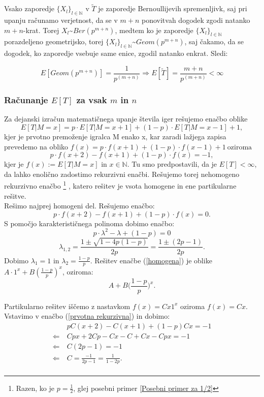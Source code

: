 \documentclass[12pt, a4paper]{article}
\begin{document}
Vsako zaporedje $\{X_l\}_{l \in \mathbb{N}}$ v $\widetilde{T}$ je zaporedje Bernoullijevih spremenljivk, saj pri upanju računamo verjetnost, da se v $m+n$ ponovitvah dogodek zgodi natanko $m+n$-krat. Torej $X_l$\textasciitilde $Ber(p^{m+n})$, medtem ko je zaporedje 
$\{X_l\}_{l \in \mathbb{N}}$ porazdeljeno geometrijsko, torej $\{X_l\}_{l \in \mathbb{N}}$\textasciitilde $Geom(p^{m+n})$, saj čakamo, da se dogodek, ko zaporedje vsebuje same enice, zgodil natanko enkrat. Sledi:

$$E[Geom(p^{m+n})]=\frac{1}{p^{(m+n)}} \Longrightarrow E[\widetilde{T}] = \frac{m+n}{p^{(m+n)}} < \infty$$

\newpage
\subsubsection{Računanje $E[T]$ za vsak $m$ in $n$}
Za dejanski izračun matematičnega upanje števila iger rešujemo enačbo oblike $$E[T|M=x] = p\cdot E[T|M=x+1] + (1-p)\cdot E[T|M=x-1] + 1,$$ kjer je prvotno premoženje igralca M enako x, kar zaradi lažjega zapisa prevedemo na obliko $f(x) = p\cdot f(x+1) + (1-p) \cdot f(x-1) + 1 ~ \textrm{oziroma} $ 
\begin{equation}
\label{prvotna rekurzivna}
p\cdot f(x+2) - f(x+1) + (1-p)\cdot f(x) = -1,
\end{equation}
kjer je $f(x):=E[T|M=x]$ in $x \in \mathbb{N}$. Tu smo predpostavili, da je $E[T] < \infty$, da lahko enolično zadostimo rekurzivni enačbi. 
Rešujemo torej nehomogeno rekurzivno enačbo \footnote{Razen, ko je $p=\frac{1}{2}$, glej posebni primer \ref{Posebni primer za 1/2} } , katero rešitev je vsota homogene in ene partikularne rešitve. \\

Rešimo najprej homogeni del. Rešujemo enačbo: 
\begin{equation}
\label{homogena}
p\cdot f(x+2) - f(x+1) + (1-p)\cdot f(x) = 0.
\end{equation}
S pomočjo karakterističnega polinoma dobimo enačbo: $$p\cdot  \lambda ^2 - \lambda + (1-p) = 0$$ $$\lambda _{1, 2}= \frac{1 \pm \sqrt{1 - 4p(1-p)}}{2p} = \frac{1 \pm (2p-1)}{2p}.$$
Dobimo $\lambda _{1} = 1$ in $\lambda _{2} = \frac{1-p}{p}$. Rešitev enačbe (\ref{homogena}) je oblike $A\cdot 1^x + B(\frac{1-p}{p})^x$, oziroma: $$A+ B \bigg( \frac{1-p}{p} \bigg )^x. $$

Partikularno rešitev iščemo z nastavkom $f(x)= Cx1^x$ oziroma $f(x)= Cx$. Vstavimo v enačbo (\ref{prvotna rekurzivna}) in dobimo: 
\begin{equation*}
\begin{split}
 &~pC(x+2)-C(x+1)+(1-p)Cx=-1\\
\Leftarrow & ~Cpx+2Cp-Cx-C+Cx-Cpx=-1 \\
\Leftarrow & ~C(2p-1)=-1\\
\Leftarrow & ~C=\frac{-1}{2p-1} = \frac{1}{1-2p}.\\
\end{split}
\end{equation*}
 
\end{document}
